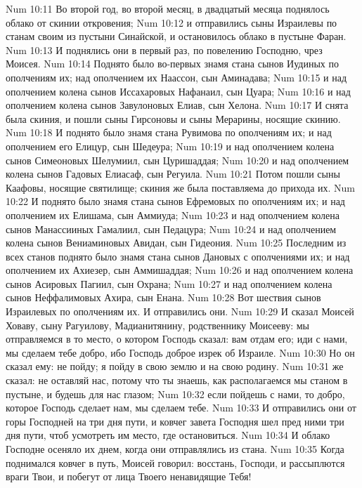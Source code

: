 \rsbpar\vs Num 10:11 Во второй год, во второй месяц, в двадцатый  месяца поднялось облако от скинии откровения;
\vs Num 10:12 и отправились сыны Израилевы по станам своим из пустыни Синайской, и остановилось облако в пустыне Фаран.
\vs Num 10:13 И поднялись они в первый раз, по повелению Господню,  чрез Моисея.
\vs Num 10:14 Поднято было во-первых знамя стана сынов Иудиных по ополчениям их; над ополчением их Наассон, сын Аминадава;
\vs Num 10:15 и над ополчением колена сынов Иссахаровых Нафанаил, сын Цуара;
\vs Num 10:16 и над ополчением колена сынов Завулоновых Елиав, сын Хелона.
\vs Num 10:17 И снята была скиния, и пошли сыны Гирсоновы и сыны Мерарины, носящие скинию.
\vs Num 10:18 И поднято было знамя стана Рувимова по ополчениям их; и над ополчением его Елицур, сын Шедеура;
\vs Num 10:19 и над ополчением колена сынов Симеоновых Шелумиил, сын Цуришаддая;
\vs Num 10:20 и над ополчением колена сынов Гадовых Елиасаф, сын Регуила.
\vs Num 10:21 Потом пошли сыны Каафовы, носящие святилище; скиния же была поставляема до прихода их.
\vs Num 10:22 И поднято было знамя стана сынов Ефремовых по ополчениям их; и над ополчением их Елишама, сын Аммиуда;
\vs Num 10:23 и над ополчением колена сынов Манассииных Гамалиил, сын Педацура;
\vs Num 10:24 и над ополчением колена сынов Вениаминовых Авидан, сын Гидеония.
\vs Num 10:25 Последним из всех станов поднято было знамя стана сынов Дановых с ополчениями их; и над ополчением их Ахиезер, сын Аммишаддая;
\vs Num 10:26 и над ополчением колена сынов Асировых Пагиил, сын Охрана;
\vs Num 10:27 и над ополчением колена сынов Неффалимовых Ахира, сын Енана.
\vs Num 10:28 Вот  шествия сынов Израилевых по ополчениям их. И отправились они.
\rsbpar\vs Num 10:29 И сказал Моисей Ховаву, сыну Рагуилову, Мадианитянину, родственнику Моисееву: мы отправляемся в то место, о котором Господь сказал: вам отдам его; иди с нами, мы сделаем тебе добро, ибо Господь доброе изрек об Израиле.
\vs Num 10:30 Но он сказал ему: не пойду; я пойду в свою землю и на свою родину.
\vs Num 10:31  же сказал: не оставляй нас, потому что ты знаешь, как располагаемся мы станом в пустыне, и будешь для нас глазом;
\vs Num 10:32 если пойдешь с нами, то добро, которое Господь сделает нам, мы сделаем тебе.
\vs Num 10:33 И отправились они от горы Господней на три дня пути, и ковчег завета Господня шел пред ними три дня пути, чтоб усмотреть им место, где остановиться.
\vs Num 10:34 И облако Господне осеняло их днем, когда они отправлялись из стана.
\vs Num 10:35 Когда поднимался ковчег в путь, Моисей говорил: восстань, Господи, и рассыплются враги Твои, и побегут от лица Твоего ненавидящие Тебя!
